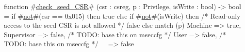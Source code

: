 function #\hyperref[sailRISCVzcheckzyseedzyCSR]{check\_seed\_CSR}# (csr : csreg, p : Privilege, isWrite : bool) -> bool = {
  if #\hyperref[sailRISCVznot]{not}#(csr == 0x015) then {
    true
  } else if #\hyperref[sailRISCVznot]{not}#(isWrite) then {
    /* Read-only access to the seed CSR is not allowed */
    false
  } else {
    match (p) {
      Machine => true,
      Supervisor => false, /* TODO: base this on mseccfg */
      User => false, /* TODO: base this on mseccfg */
      _ => false
    }
  }
}
